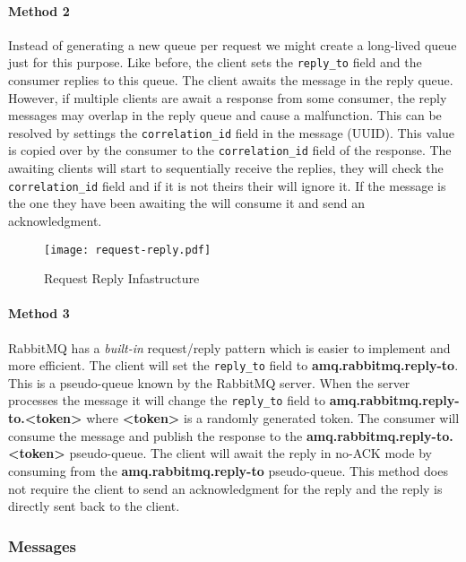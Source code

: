 \documentclass[../documentation.tex]{subfiles}
\begin{document}
\paragraph{Method 2} Instead of generating a new queue per request we might create a long-lived queue
just for this purpose. Like before, the client sets the \texttt{reply\_to} field and the consumer replies
to this queue. The client awaits the message in the reply queue. However, if multiple clients
are await a response from some consumer, the reply messages may overlap in the reply queue and cause a malfunction.
This can be resolved by settings the \texttt{correlation\_id} field in the message (UUID). This value is copied
over by the consumer to the \texttt{correlation\_id} field of the response. The awaiting clients will start to
sequentially receive the replies, they will check the \texttt{correlation\_id} field and if it is not theirs
their will ignore it. If the message is the one they have been awaiting the will consume it and send an acknowledgment.

\begin{figure}[h]
    \centering
    \texttt{[image: request-reply.pdf]}
    \caption{Request Reply Infastructure}
\end{figure}

\paragraph{Method 3} RabbitMQ has a \textit{built-in} request/reply pattern which is easier to implement and more efficient.
The client will set the \texttt{reply\_to} field to \textbf{amq.rabbitmq.reply-to}.
This is a pseudo-queue known by the RabbitMQ server. When the server processes the message it will change
the \texttt{reply\_to} field to \textbf{amq.rabbitmq.reply-to.<token>} where \textbf{<token>} is a randomly generated
token. The consumer will consume the message and publish the response to the \textbf{amq.rabbitmq.reply-to.<token>}
pseudo-queue. The client will await the reply in no-ACK mode by consuming from the \textbf{amq.rabbitmq.reply-to} pseudo-queue.
This method does not require the client to send an acknowledgment for the reply and the reply is directly sent back to the client.

\pagebreak

\subsubsection{Messages}
\end{document}
